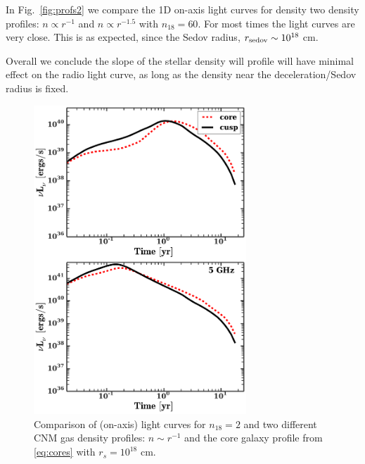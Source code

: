 \documentclass[usenatbib,fleqn]{mnras}
\begin{document}
In Fig.~\ref{fig:profs2} we compare the 1D on-axis light curves for
density two density profiles: $n\propto r^{-1}$ and $n\propto r^{-1.5}$
with $n_{18}=60$. For most times the light curves are very close.
This is as expected, since the Sedov radius, $r_{\rm sedov}\sim
10^{18}$ cm. 

Overall we conclude the slope of the stellar density will profile will
have minimal effect on the radio light curve, as long as the density
near the deceleration/Sedov radius is fixed. 

\begin{figure} 
  \includegraphics[width=8cm]{fig_cores.pdf}
  \caption{\label{fig:cores} Comparison of (on-axis) light curves for
    $n_{18}=2$ and two different CNM gas density profiles: $n\sim
    r^{-1}$ and the core galaxy profile from \eqref{eq:cores} with
    $r_s=10^{18}$ cm.}
\end{figure}
\end{document}
